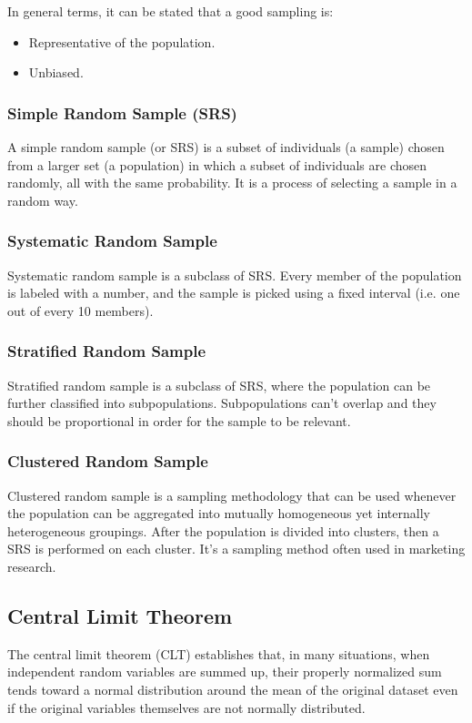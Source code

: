 \documentclass{article}
\begin{document}
In general terms, it can be stated that a good sampling is:
\begin{itemize}
    \item Representative of the population.
    \item Unbiased. 
\end{itemize}
 
\subsubsection{Simple Random Sample (SRS)}
A simple random sample (or SRS) is a subset of individuals (a sample) chosen from a larger set (a population) in which a subset of individuals are chosen randomly, all with the same probability. It is a process of selecting a sample in a random way.

\subsubsection{Systematic Random Sample}
Systematic random sample is a subclass of SRS. Every member of the population is labeled with a number, and the sample is picked using a fixed interval (i.e. one out of every 10 members).

\subsubsection{Stratified Random Sample}
Stratified random sample is a subclass of SRS, where the population can be further classified into subpopulations. Subpopulations can’t overlap and they should be proportional in order for the sample to be relevant. 

\subsubsection{Clustered Random Sample}
Clustered random sample is a sampling methodology that can be used whenever the population can be aggregated into mutually homogeneous yet internally heterogeneous groupings. 
After the population is divided into clusters, then a SRS is performed on each cluster.
It’s a sampling method often used in marketing research.

\subsection{Central Limit Theorem}
The central limit theorem (CLT) establishes that, in many situations, when independent random variables are summed up, their properly normalized sum tends toward a normal distribution around the mean of the original dataset even if the original variables themselves are not normally distributed.
\end{document}
